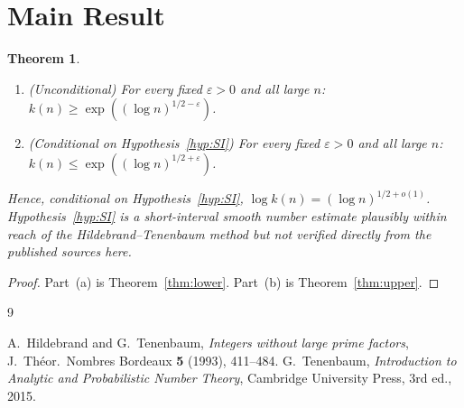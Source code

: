 \documentclass[12pt]{article}
\newtheorem{theorem}{Theorem}
\theoremstyle{definition}
\begin{document}
\section{Main Result}

\begin{theorem}\label{thm:main}
\begin{enumerate}
\item[\rm(a)] (Unconditional) For every fixed $\varepsilon > 0$ and all large $n$:
  $k(n) \geq \exp((\log n)^{1/2-\varepsilon})$.
\item[\rm(b)] (Conditional on Hypothesis~\ref{hyp:SI}) For every fixed $\varepsilon > 0$
  and all large $n$: $k(n) \leq \exp((\log n)^{1/2+\varepsilon})$.
\end{enumerate}
Hence, conditional on Hypothesis~\ref{hyp:SI}, $\log k(n) = (\log n)^{1/2+o(1)}$.
Hypothesis~\ref{hyp:SI} is a short-interval smooth number estimate
plausibly within reach of the Hildebrand--Tenenbaum method
but not verified directly from the published sources \cite{HT,Ten} here.
\end{theorem}

\begin{proof}
Part~(a) is Theorem~\ref{thm:lower}.
Part~(b) is Theorem~\ref{thm:upper}.
\end{proof}

\begin{thebibliography}{9}

  A.\ Hildebrand and G.\ Tenenbaum,
  \emph{Integers without large prime factors},
  J.\ Th\'eor.\ Nombres Bordeaux \textbf{5} (1993), 411--484.
  G.\ Tenenbaum,
  \emph{Introduction to Analytic and Probabilistic Number Theory},
  Cambridge University Press, 3rd ed., 2015.

\end{thebibliography}
\end{document}
